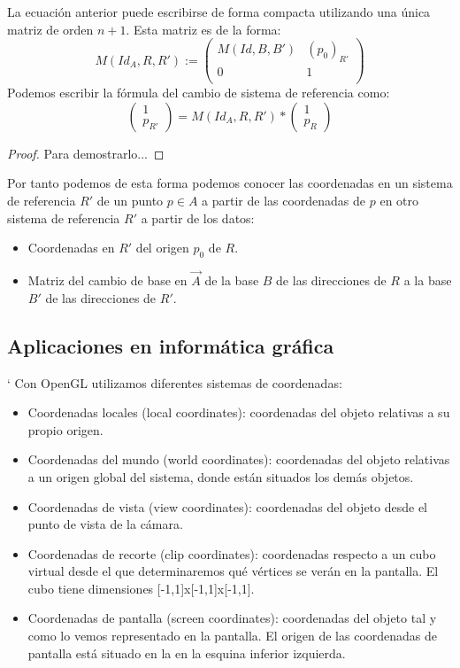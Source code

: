 \documentclass[a4paper,11pt, oneside]{book}
\begin{document}
\begin{matriz_cambio_sist_referencia}
La ecuación anterior puede escribirse de forma compacta utilizando una única matriz de orden $n+1$. Esta matriz es de la forma:
\begin{equation}
M(Id_A, R, R') := 
\begin{pmatrix}
M(Id, B, B') & (p_0)_{R'} \\
0 			 & 1 \\
\end{pmatrix}
\end{equation}
Podemos escribir la fórmula del cambio de sistema de referencia como:
\begin{equation}
\begin{pmatrix}
1 \\
p_{R'}
\end{pmatrix}
 = M(Id_A, R, R')*\begin{pmatrix}
 1 \\
 p_R
 \end{pmatrix}
\end{equation}
\end{matriz_cambio_sist_referencia}
\begin{proof}
	Para demostrarlo...
\end{proof}

Por tanto podemos de esta forma podemos conocer las coordenadas en un sistema de referencia $R'$ de un punto $p \in A$ a partir de las coordenadas de $p$ en otro sistema de referencia $R'$ a partir de los datos:
\begin{itemize}
	\item Coordenadas en $R'$ del origen $p_0$ de $R$.
	\item Matriz del cambio de base en $\overrightarrow{A}$ de la base $B$ de las direcciones de $R$ a la base $B'$ de las direcciones de $R'$.
\end{itemize}
\subsection{Aplicaciones en informática gráfica}
`
Con OpenGL utilizamos diferentes sistemas de coordenadas:
\begin{itemize}
	\item Coordenadas locales (local coordinates): coordenadas del objeto relativas a su propio origen.
	\item Coordenadas del mundo (world coordinates): coordenadas del objeto relativas a un origen global del sistema, donde están situados los demás objetos.
	\item Coordenadas de vista (view coordinates): coordenadas del objeto desde el punto de vista de la cámara.
	\item Coordenadas de recorte (clip coordinates): coordenadas respecto a un cubo virtual desde el que determinaremos qué vértices se verán en la pantalla. El cubo tiene dimensiones [-1,1]x[-1,1]x[-1,1].
	\item Coordenadas de pantalla (screen coordinates): coordenadas del objeto tal y como lo vemos representado en la pantalla. El origen de las coordenadas de pantalla está situado en la en la esquina inferior izquierda.
\end{itemize} 
\end{document}
